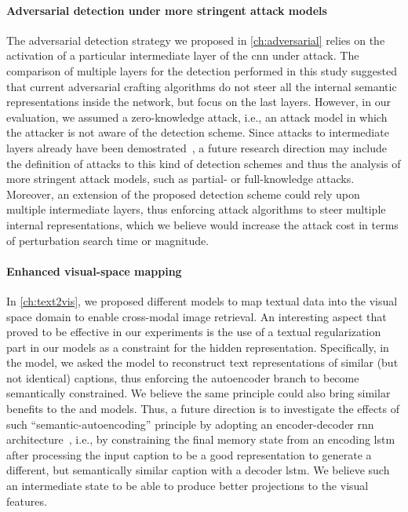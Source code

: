 \paragraph{Adversarial detection under more stringent attack models}
The adversarial detection strategy we proposed in \ref{ch:adversarial} relies on the activation of a particular intermediate layer of the \gls{cnn} under attack.
The comparison of multiple layers for the detection performed in this study suggested that current adversarial crafting algorithms do not steer all the internal semantic representations inside the network, but focus on the last layers.
However, in our evaluation, we assumed a zero-knowledge attack, i.e., an attack model in which the attacker is not aware of the detection scheme.
Since attacks to intermediate layers already have been demostrated~\cite{sabour2015adversarial}, a future research direction may include the definition of attacks to this kind of detection schemes and thus the analysis of more stringent attack models, such as partial- or full-knowledge attacks.
Moreover, an extension of the proposed detection scheme could rely upon multiple intermediate layers, thus enforcing attack algorithms to steer multiple internal representations, which we believe would increase the attack cost in terms of perturbation search time or magnitude.

\paragraph{Enhanced visual-space mapping}
In \ref{ch:text2vis}, we proposed different models to map textual data into the visual space domain to enable cross-modal image retrieval.
An interesting aspect that proved to be effective in our experiments is the use of a textual regularization part in our models as a constraint for the hidden representation.
Specifically, in the \sparsettv{} model, we asked the model to reconstruct text representations of similar (but not identical) captions, thus enforcing the autoencoder branch to become semantically constrained.
We believe the same principle could also bring similar benefits to the \densettv{} and \widedeepttv{} models.
Thus, a future direction is to investigate the effects of such ``semantic-autoencoding'' principle by adopting an encoder-decoder \gls{rnn} architecture~\cite{cho2014learning}, i.e.,  by constraining the final memory state from an encoding \gls{lstm} after processing the input caption to be a good representation to generate a different, but semantically similar caption with a decoder \gls{lstm}.
We believe such an intermediate state to be able to produce better projections to the visual features.

